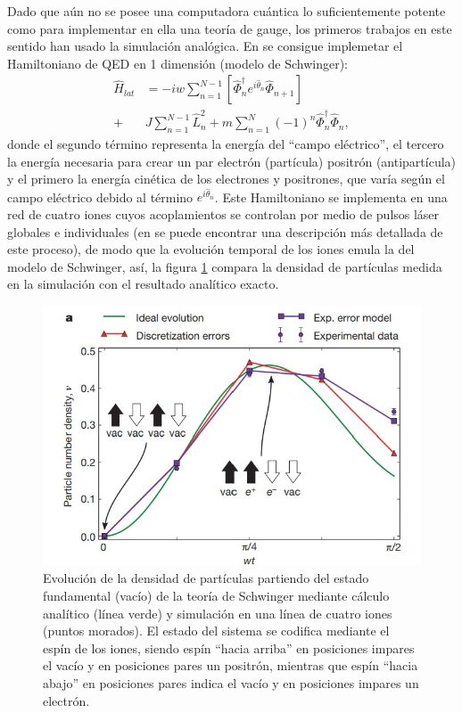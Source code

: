 \documentclass[a4paper,10pt]{article}
\begin{document}
\begin{multicols}{2}
Dado que aún no se posee una computadora cuántica lo suficientemente potente como para implementar en ella una teoría de gauge, los primeros trabajos en este sentido han usado la simulación analógica. En \cite{martinez_real-time_2016} se consigue implemetar el Hamiltoniano de QED en 1 dimensión (modelo de Schwinger): 
\begin{align*}
\hat{H}_{lat} &  = -iw\sum_{n=1}^{N-1}\left[\hat{\Phi}^{\dagger}_{n}e^{i\hat{\theta}_{n}}\hat{\Phi}_{n+1} \right] \\
 + & J\sum_{n=1}^{N-1}\hat{L}_{n}^2 + m \sum_{n=1}^{N}(-1)^{n}\hat{\Phi}^{\dagger}_{n}\hat{\Phi}_{n},
\end{align*}
donde el segundo término representa la energía del ``campo eléctrico'', el tercero la energía necesaria para crear un par electrón (partícula) positrón (antipartícula) y el primero la energía cinética de los electrones y positrones, que varía según el campo eléctrico debido al término $e^{i\hat{\theta}_{n}}$. Este Hamiltoniano se implementa en una red de cuatro iones cuyos acoplamientos se controlan por medio de pulsos láser globales e individuales (en \cite{davoudi_towards_2020} se puede encontrar una descripción más detallada de este proceso), de modo que la evolución temporal de los iones emula la del modelo de Schwinger, así, la figura \ref{SchwingerDensity} compara la densidad de partículas medida en la simulación con el resultado analítico exacto. 
\begin{figure}[H]
\begin{center}
\includegraphics[scale=0.8]{Imágenes/Creación pares partícula-antipartícula.jpg}
\end{center}
\caption{Evolución de la densidad de partículas partiendo del estado fundamental (vacío) de la teoría de Schwinger mediante cálculo analítico (línea verde) y simulación en una línea de cuatro iones (puntos morados). El estado del sistema se codifica mediante el espín de los iones, siendo espín ``hacia arriba'' en posiciones impares el vacío y en posiciones pares un positrón, mientras que espín ``hacia abajo'' en posiciones pares indica el vacío y en posiciones impares un electrón.}
\label{SchwingerDensity}
\end{figure}


\end{multicols}
\end{document}
